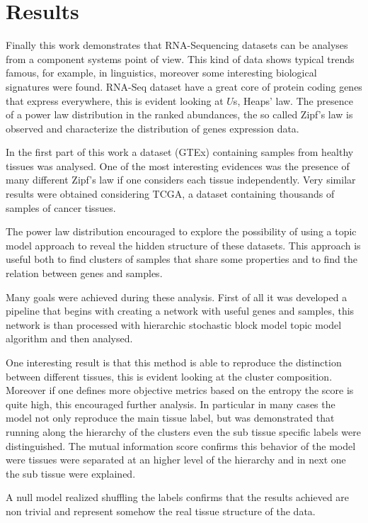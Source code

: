 \chapter{Results}\label{ch:results}
Finally this work demonstrates that RNA-Sequencing datasets can be analyses from a component systems point of view.
This kind of data shows typical trends famous, for example, in linguistics, moreover some interesting biological signatures were found. RNA-Seq dataset have a great core of protein coding genes that express everywhere, this is evident looking at $U$s, Heaps' law. The presence of a power law distribution in the ranked abundances, the so called Zipf's law is observed and characterize the distribution of genes expression data.

In the first part of this work a dataset (GTEx) containing samples from healthy tissues was analysed. One of the most interesting evidences was the presence of many different Zipf's law if one considers each tissue independently. Very similar results were obtained considering TCGA, a dataset containing thousands of samples of cancer tissues.

The power law distribution encouraged to explore the possibility of using a topic model approach to reveal the hidden structure of these datasets. This approach is useful both to find clusters of samples that share some properties and to find the relation between genes and samples.

Many goals were achieved during these analysis.
First of all it was developed a pipeline that begins with creating a network with useful genes and samples, this network is than processed with hierarchic stochastic block model topic model algorithm and then analysed.

One interesting result is that this method is able to reproduce the distinction between different tissues, this is evident looking at the cluster composition. Moreover if one defines more objective metrics based on the entropy the score is quite high, this encouraged further analysis.
In particular in many cases the model not only reproduce the main tissue label, but was demonstrated that running along the hierarchy of the clusters even the sub tissue specific labels were distinguished. The mutual information score confirms this behavior of the model were tissues were separated at an higher level of the hierarchy and in next one the sub tissue were explained.

A null model realized shuffling the labels confirms that the results achieved are non trivial and represent somehow the real tissue structure of the data.

